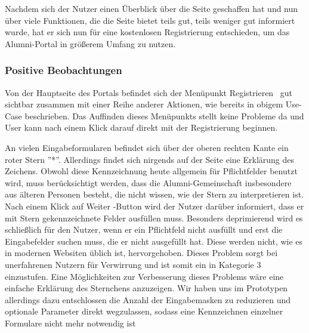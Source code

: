 Nachdem sich der Nutzer einen Überblick über die Seite geschaffen hat und nun über viele Funktionen, die die Seite
bietet teils gut, teils weniger gut informiert wurde, hat er sich nun für eine kostenlosen Registrierung entschieden, um das Alumni-Portal in größerem Umfang zu nutzen.

\subsubsection*{Positive Beobachtungen}
Von der Hauptseite des Portals befindet sich der Menüpunkt \glqq Registrieren \grqq ~gut sichtbar zusammen mit einer Reihe anderer Aktionen,
wie bereits in obigem Use-Case beschrieben. Das Auffinden dieses Menüpunkts stellt keine Probleme da und User kann nach einem Klick darauf direkt mit der Registrierung
beginnen.


{ An vielen Eingabeformularen befindet sich über der oberen rechten Kante ein roter Stern ”*”. Allerdings findet sich nirgends auf der Seite eine Erklärung des Zeichens.
Obwohl diese Kennzeichnung heute allgemein für Pflichtfelder benutzt wird, muss berücksichtigt werden, dass die Alumni-Gemeinschaft insbesondere aus älteren Personen besteht, die nicht wissen, wie der Stern zu interpretieren ist. Nach einem Klick auf \glqq Weiter \grqq -Button wird der Nutzer darüber informiert, dass er mit Stern gekennzeichnete Felder ausfüllen muss.
}
{ Besonders deprimierend wird es schließlich für den Nutzer, wenn er ein Pflichtfeld nicht ausfüllt und erst die Eingabefelder suchen muss, die er nicht ausgefüllt hat. Diese werden nicht, wie es in modernen Websiten üblich ist, hervorgehoben. Dieses Problem sorgt bei unerfahrenen Nutzern für Verwirrung und ist somit ein in Kategorie 3 einzustufen.
}
{ Eine Möglichkeiten zur Verbesserung dieses Problems wäre eine einfache Erklärung des Sternchens anzuzeigen. Wir haben uns im Prototypen allerdings dazu entschlossen die Anzahl der Eingabemasken zu reduzieren und optionale Parameter direkt wegzulassen, sodass eine Kennzeichnen einzelner Formulare nicht mehr notwendig ist
}

